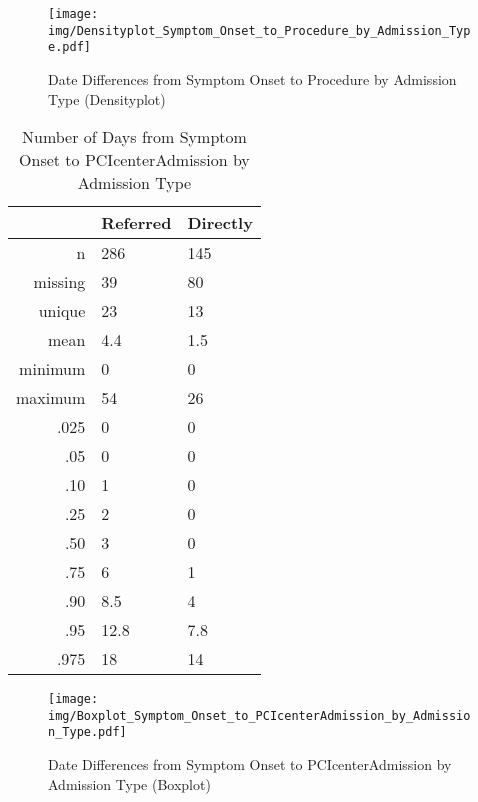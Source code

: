 \documentclass[presentation,xcolor=pdftex,dvipsnames,table,11pt]{beamer}
\begin{document}
\begin{tiny}
\begin{frame}
\begin{figure}
  \centering
  \caption{Date Differences from Symptom Onset to Procedure by Admission Type (Densityplot)}
  \label{Density: Date Differences from Symptom Onset to Procedure by Admission Type}
\texttt{[image: img/Densityplot\_Symptom\_Onset\_to\_Procedure\_by\_Admission\_Type.pdf]}\end{figure}
\end{frame}



\begin{table}[ht]
\centering
\begin{tabular}{rll}
  \toprule
 & Referred & Directly \\ 
  \midrule
n & 286 & 145 \\ 
  missing & 39 & 80 \\ 
  unique & 23 & 13 \\ 
  mean & 4.4 & 1.5 \\ 
  minimum & 0 & 0 \\ 
  maximum & 54 & 26 \\ 
  .025 & 0 & 0 \\ 
  .05 & 0 & 0 \\ 
  .10 & 1 & 0 \\ 
  .25 & 2 & 0 \\ 
  .50 & 3 & 0 \\ 
  .75 & 6 & 1 \\ 
  .90 & 8.5 & 4 \\ 
  .95 & 12.8 & 7.8 \\ 
  .975 & 18 & 14 \\ 
   \bottomrule
\end{tabular}
\caption{Number of Days from Symptom Onset to PCIcenterAdmission by Admission Type} 
\end{table}
\begin{frame}
\begin{figure}
  \centering
  \caption{Date Differences from Symptom Onset to PCIcenterAdmission by Admission Type (Boxplot)}
  \label{Boxplot: Date Differences from Symptom Onset to PCIcenterAdmission by Admission Type}
\texttt{[image: img/Boxplot\_Symptom\_Onset\_to\_PCIcenterAdmission\_by\_Admission\_Type.pdf]}\end{figure}
\end{frame}



\end{tiny}
\end{document}
